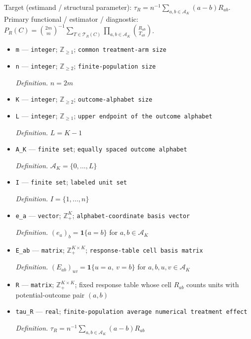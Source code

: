 \documentclass{article}
\begin{document}
Target (estimand / structural parameter): \(\tau_R=n^{-1}\sum_{a,b\in\mathcal A_K}(a-b)R_{ab}\).
Primary functional / estimator / diagnostic: \(P_R(C)=\binom{2m}{m}^{-1}\sum_{T\in\mathcal T_R(C)}\prod_{a,b\in\mathcal A_K}\binom{R_{ab}}{T_{ab}}\).
\begin{itemize}
  \item \texttt{m} --- \texttt{integer}; \(\mathbb Z_{\geq1}\); \texttt{common treatment-\allowbreak{}arm size}
  \item \texttt{n} --- \texttt{integer}; \(\mathbb Z_{\geq2}\); \texttt{finite-\allowbreak{}population size}
  \par\smallskip\noindent\emph{Definition.} \(n=2m\)
  \item \texttt{K} --- \texttt{integer}; \(\mathbb Z_{\geq2}\); \texttt{outcome-\allowbreak{}alphabet size}
  \item \texttt{L} --- \texttt{integer}; \(\mathbb Z_{\geq1}\); \texttt{upper endpoint of the outcome alphabet}
  \par\smallskip\noindent\emph{Definition.} \(L=K-1\)
  \item \texttt{A\_\allowbreak{}K} --- \texttt{finite set}; \texttt{equally spaced outcome alphabet}
  \par\smallskip\noindent\emph{Definition.} \(\mathcal A_K=\{0,\ldots,L\}\)
  \item \texttt{I} --- \texttt{finite set}; \texttt{labeled unit set}
  \par\smallskip\noindent\emph{Definition.} \(I=\{1,\ldots,n\}\)
  \item \texttt{e\_\allowbreak{}a} --- \texttt{vector}; \(\mathbb Z_+^K\); \texttt{alphabet-\allowbreak{}coordinate basis vector}
  \par\smallskip\noindent\emph{Definition.} \((e_a)_b=\mathbf 1\{a=b\}\) for \(a,b\in\mathcal A_K\)
  \item \texttt{E\_\allowbreak{}ab} --- \texttt{matrix}; \(\mathbb Z_+^{K\times K}\); \texttt{response-\allowbreak{}table cell basis matrix}
  \par\smallskip\noindent\emph{Definition.} \((E_{ab})_{uv}=\mathbf 1\{u=a,\ v=b\}\) for \(a,b,u,v\in\mathcal A_K\)
  \item \texttt{R} --- \texttt{matrix}; \(\mathbb Z_+^{K\times K}\); fixed response table whose cell \(R_{ab}\) counts units with potential-outcome pair \((a,b)\)
  \item \texttt{tau\_\allowbreak{}R} --- \texttt{real}; \texttt{finite-\allowbreak{}population average numerical treatment effect}
  \par\smallskip\noindent\emph{Definition.} \(\tau_R=n^{-1}\sum_{a,b\in\mathcal A_K}(a-b)R_{ab}\)

\end{itemize}
\end{document}

